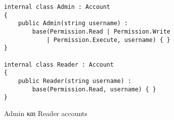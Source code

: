 \begin{listing}[htbp]
\begin{verbatim}
internal class Admin : Account
{
    public Admin(string username) : 
        base(Permission.Read | Permission.Write 
            | Permission.Execute, username) { }
}

internal class Reader : Account
{
    public Reader(string username) : 
        base(Permission.Read, username) { }
}
\end{verbatim}
\caption{Admin και Reader accounts}
\label{flagSubclasses}
\end{listing}
